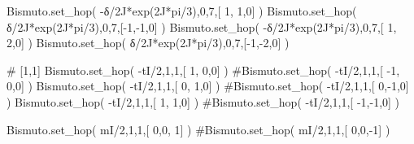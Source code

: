 \documentclass[
  letterpaper,
  DIV=11,
  numbers=noendperiod]{scrreprt}
\newenvironment{Shaded}{\begin{snugshade}}{\end{snugshade}}
\newcommand{\CommentTok}[1]{\textcolor[rgb]{0.37,0.37,0.37}{#1}}
\newcommand{\DecValTok}[1]{\textcolor[rgb]{0.68,0.00,0.00}{#1}}
\newcommand{\NormalTok}[1]{\textcolor[rgb]{0.00,0.23,0.31}{#1}}
\newcommand{\OperatorTok}[1]{\textcolor[rgb]{0.37,0.37,0.37}{#1}}
\newcommand{\OtherTok}[1]{\textcolor[rgb]{0.00,0.23,0.31}{#1}}
\begin{document}
\begin{Shaded}
\begin{Highlighting}[]
\NormalTok{Bismuto.set\_hop( }\OperatorTok{{-}}\NormalTok{δ}\OperatorTok{/}\OtherTok{2J}\OperatorTok{*}\NormalTok{exp(}\OtherTok{2J}\OperatorTok{*}\NormalTok{pi}\OperatorTok{/}\DecValTok{3}\NormalTok{),}\DecValTok{0}\NormalTok{,}\DecValTok{7}\NormalTok{,[ }\DecValTok{1}\NormalTok{, }\DecValTok{1}\NormalTok{,}\DecValTok{0}\NormalTok{] ) }
\NormalTok{Bismuto.set\_hop(  δ}\OperatorTok{/}\OtherTok{2J}\OperatorTok{*}\NormalTok{exp(}\OtherTok{2J}\OperatorTok{*}\NormalTok{pi}\OperatorTok{/}\DecValTok{3}\NormalTok{),}\DecValTok{0}\NormalTok{,}\DecValTok{7}\NormalTok{,[}\OperatorTok{{-}}\DecValTok{1}\NormalTok{,}\OperatorTok{{-}}\DecValTok{1}\NormalTok{,}\DecValTok{0}\NormalTok{] ) }
\NormalTok{Bismuto.set\_hop( }\OperatorTok{{-}}\NormalTok{δ}\OperatorTok{/}\OtherTok{2J}\OperatorTok{*}\NormalTok{exp(}\OtherTok{2J}\OperatorTok{*}\NormalTok{pi}\OperatorTok{/}\DecValTok{3}\NormalTok{),}\DecValTok{0}\NormalTok{,}\DecValTok{7}\NormalTok{,[ }\DecValTok{1}\NormalTok{, }\DecValTok{2}\NormalTok{,}\DecValTok{0}\NormalTok{] ) }
\NormalTok{Bismuto.set\_hop(  δ}\OperatorTok{/}\OtherTok{2J}\OperatorTok{*}\NormalTok{exp(}\OtherTok{2J}\OperatorTok{*}\NormalTok{pi}\OperatorTok{/}\DecValTok{3}\NormalTok{),}\DecValTok{0}\NormalTok{,}\DecValTok{7}\NormalTok{,[}\OperatorTok{{-}}\DecValTok{1}\NormalTok{,}\OperatorTok{{-}}\DecValTok{2}\NormalTok{,}\DecValTok{0}\NormalTok{] ) }
\end{Highlighting}
\end{Shaded}

\begin{Shaded}
\begin{Highlighting}[]
\CommentTok{\# [1,1]}
\NormalTok{Bismuto.set\_hop( }\OperatorTok{{-}}\NormalTok{tI}\OperatorTok{/}\DecValTok{2}\NormalTok{,}\DecValTok{1}\NormalTok{,}\DecValTok{1}\NormalTok{,[  }\DecValTok{1}\NormalTok{, }\DecValTok{0}\NormalTok{,}\DecValTok{0}\NormalTok{] ) }
\CommentTok{\#Bismuto.set\_hop( {-}tI/2,1,1,[ {-}1, 0,0] ) }
\NormalTok{Bismuto.set\_hop( }\OperatorTok{{-}}\NormalTok{tI}\OperatorTok{/}\DecValTok{2}\NormalTok{,}\DecValTok{1}\NormalTok{,}\DecValTok{1}\NormalTok{,[  }\DecValTok{0}\NormalTok{, }\DecValTok{1}\NormalTok{,}\DecValTok{0}\NormalTok{] ) }
\CommentTok{\#Bismuto.set\_hop( {-}tI/2,1,1,[  0,{-}1,0] ) }
\NormalTok{Bismuto.set\_hop( }\OperatorTok{{-}}\NormalTok{tI}\OperatorTok{/}\DecValTok{2}\NormalTok{,}\DecValTok{1}\NormalTok{,}\DecValTok{1}\NormalTok{,[  }\DecValTok{1}\NormalTok{, }\DecValTok{1}\NormalTok{,}\DecValTok{0}\NormalTok{] ) }
\CommentTok{\#Bismuto.set\_hop( {-}tI/2,1,1,[ {-}1,{-}1,0] ) }

\NormalTok{Bismuto.set\_hop( mI}\OperatorTok{/}\DecValTok{2}\NormalTok{,}\DecValTok{1}\NormalTok{,}\DecValTok{1}\NormalTok{,[ }\DecValTok{0}\NormalTok{,}\DecValTok{0}\NormalTok{, }\DecValTok{1}\NormalTok{] ) }
\CommentTok{\#Bismuto.set\_hop( mI/2,1,1,[ 0,0,{-}1] ) }
\end{Highlighting}
\end{Shaded}
\end{document}
